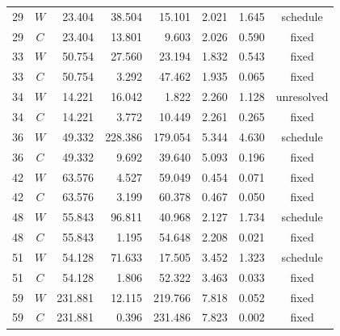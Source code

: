 \begin{longtable}{rcrrrrrc}
29 & $W$ & 23.404 & 38.504 & 15.101 & 2.021 & 1.645 & schedule \\
29 & $C$ & 23.404 & 13.801 & 9.603 & 2.026 & 0.590 & fixed \\
33 & $W$ & 50.754 & 27.560 & 23.194 & 1.832 & 0.543 & fixed \\
33 & $C$ & 50.754 & 3.292 & 47.462 & 1.935 & 0.065 & fixed \\
34 & $W$ & 14.221 & 16.042 & 1.822 & 2.260 & 1.128 & unresolved \\
34 & $C$ & 14.221 & 3.772 & 10.449 & 2.261 & 0.265 & fixed \\
36 & $W$ & 49.332 & 228.386 & 179.054 & 5.344 & 4.630 & schedule \\
36 & $C$ & 49.332 & 9.692 & 39.640 & 5.093 & 0.196 & fixed \\
42 & $W$ & 63.576 & 4.527 & 59.049 & 0.454 & 0.071 & fixed \\
42 & $C$ & 63.576 & 3.199 & 60.378 & 0.467 & 0.050 & fixed \\
48 & $W$ & 55.843 & 96.811 & 40.968 & 2.127 & 1.734 & schedule \\
48 & $C$ & 55.843 & 1.195 & 54.648 & 2.208 & 0.021 & fixed \\
51 & $W$ & 54.128 & 71.633 & 17.505 & 3.452 & 1.323 & schedule \\
51 & $C$ & 54.128 & 1.806 & 52.322 & 3.463 & 0.033 & fixed \\
59 & $W$ & 231.881 & 12.115 & 219.766 & 7.818 & 0.052 & fixed \\
59 & $C$ & 231.881 & 0.396 & 231.486 & 7.823 & 0.002 & fixed \\
\bottomrule
\end{longtable}
